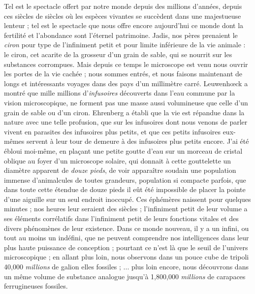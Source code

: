\documentclass[a4paper, 11pt, oneside, landscape]{article}
\begin{document}
Tel est le spectacle offert par notre monde depuis des millions d'années, depuis ces siècles de siècles où les espèces vivantes se succèdent dans une majestueuse lenteur ; tel est le spectacle que nous offre encore aujourd'hui ce monde dont la fertilité et l'abondance sont l'éternel patrimoine. Jadis, nos pères prenaient le \emph{ciron} pour type de l'infiniment petit et pour limite inférieure de la vie animale : le ciron, cet acarite de la grosseur d'un grain de sable, qui se nourrit sur les substances corrompues. Mais depuis ce temps le microscope est venu nous ouvrir les portes de la vie cachée ; nous sommes entrés, et nous faisons maintenant de longs et intéressants voyages dans des pays d'un millimètre carré. Leuwenhœck a montré que mille millions d'\emph{infusoires} découverts dans l'eau commune par la vision microscopique, ne forment pas une masse aussi volumineuse que celle d'un grain de sable ou d'un ciron. Ehrenberg a établi que la vie est répandue dans la nature avec une telle profusion, que sur les infusoires dont nous venons de parler vivent en parasites des infusoires plus petits, et que ces petits infusoires eux-mêmes servent à leur tour de demeure à des infusoires plus petits encore. J'ai été ébloui moi-même, en plaçant une petite goutte d'eau sur un morceau de cristal oblique au foyer d'un microscope solaire, qui donnait à cette gouttelette un diamètre apparent de \emph{douze pieds}, de voir apparaître soudain une population immense d'animalcules de toutes grandeurs, population si compacte parfois, que dans toute cette étendue de douze pieds il eût été impossible de placer la pointe d'une aiguille sur un seul endroit inoccupé. Ces éphémères naissent pour quelques minutes ; nos heures leur seraient des siècles ; l'infiniment petit de leur volume a ses éléments corrélatifs dans l'infiniment petit de leurs fonctions vitales et des divers phénomènes de leur existence. Dans ce monde nouveau, il y a un infini, ou tout au moins un indéfini, que ne peuvent comprendre nos intelligences dans leur plus haute puissance de conception ; pourtant ce n'est là que le seuil de l'univers microscopique ; en allant plus loin, nous observons dans un pouce cube de tripoli 40,000 \emph{millions} de galion elles fossiles ; ... plus loin encore, nous découvrons dans un même volume de substance analogue jusqu'à 1,800,000 \emph{millions} de carapaces ferrugineuses fossiles.
\end{document}
